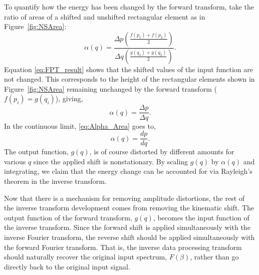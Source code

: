 To quantify how the energy has been changed by the forward transform, take the ratio of areas of a shifted and unshifted rectangular element as in Figure~\ref{fig:NSArea}:
\begin{equation}
	\label{eq:NSArea}
	\alpha \left( q \right) = \frac{\Delta p \left( \frac{f \left( p_1 \right) + f \left( p_2 \right)}{2} \right)}{\Delta q \left( \frac{g \left( q_1 \right) + g \left( q_2 \right)}{2} \right)}.
\end{equation}
Equation \ref{eq:FPT_result} shows that the shifted values of the input function are not changed.
This corresponds to the height of the rectangular elements shown in Figure~\ref{fig:NSArea} remaining unchanged by the forward transform ($f(p_i)=g(q_i)$), giving,  
\begin{equation}
	\label{eq:Alpha_Area}
	\alpha \left( q \right) = \frac{\Delta p}{\Delta q}.
\end{equation}
In the continuous limit, \ref{eq:Alpha_Area} goes to,
\begin{equation}
\alpha \left( q \right) =\frac{d p}{d q}.
\label{eq:Alpha}
\end{equation}
The output function, $g \left( q \right)$, is of course distorted by different amounts for various $q$ since the applied shift is nonstationary.
By scaling $g(q)$ by $\alpha (q)$ and integrating, we claim that the energy change can be accounted for via Rayleigh's theorem in the inverse transform.


Now that there is a mechanism for removing amplitude distortions, the rest of the inverse transform development comes from removing the kinematic shift.
The output function of the forward transform, $g \left( q \right)$, becomes the input function of the inverse transform.
Since the forward shift is applied simultaneously with the inverse Fourier transform, the reverse shift should be applied simultaneously with the forward Fourier transform.  That is, the inverse data processing transform should naturally recover the original input spectrum, $F \left( \beta \right)$, rather than go directly back to the original input signal.  

